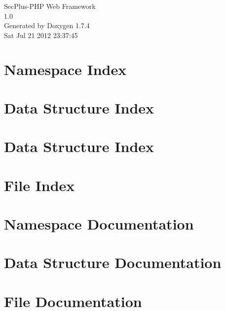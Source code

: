 \documentclass[a4paper]{book}
\begin{document}
\hypersetup{pageanchor=false}
\begin{titlepage}
\vspace*{7cm}
\begin{center}
{\Large SecPlus-\/PHP Web Framework \\[1ex]\large 1.0 }\\
\vspace*{1cm}
{\large Generated by Doxygen 1.7.4}\\
\vspace*{0.5cm}
{\small Sat Jul 21 2012 23:37:45}\\
\end{center}
\end{titlepage}
\clearemptydoublepage
{}
\tableofcontents
\clearemptydoublepage
{}
\hypersetup{pageanchor=true}
\chapter{Namespace Index}

\chapter{Data Structure Index}

\chapter{Data Structure Index}

\chapter{File Index}

\chapter{Namespace Documentation}


\chapter{Data Structure Documentation}





















\chapter{File Documentation}

\printindex
\end{document}

